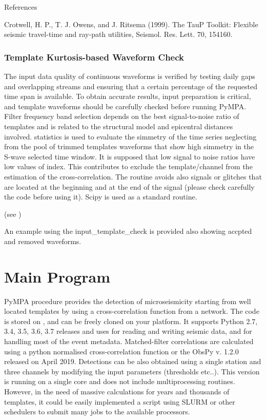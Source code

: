 \documentclass[a4paper,12pt,english]{sphinxmanual}
\let\sphinxpxdimen\pdfpxdimen\else\newdimen\sphinxpxdimen
\begin{document}
References

Crotwell, H. P., T. J. Owens, and J. Ritsema (1999). The TauP Toolkit:
Flexible seismic travel-time and ray-path utilities, Seismol. Res. Lett.
70, 154\textendash{}160.


\subsection{Template Kurtosis-based Waveform Check}
\label{\detokenize{sub/input.template_check:template-kurtosis-based-waveform-check}}\label{\detokenize{sub/input.template_check::doc}}
The input data quality of continuous waveforms is verified by testing daily gaps and overlapping streams and ensuring that a certain percentage of the requested time span is available. To obtain accurate results, input preparation is critical, and template waveforms should be carefully checked before running PyMPA. Filter frequency band selection depends on the best signal-to-noise ratio of templates and is related to the structural model and epicentral distances involved.
 statistics is used to evaluate the simmetry of the time series neglecting from the pool of trimmed templates
waveforms that show high simmetry in the S-wave selected time window. It is supposed that low signal to noise ratios
have low values of  index. This contributes to exclude the template/channel from the estimation of the cross-correlation.
The routine avoids also signals or glitches that are located at the beginning and at the end of the signal (please check carefully the code before using it).
Scipy  is used as a standard routine.

(see )

An example using the input\_template\_check is provided also showing accpted and removed waveforms.
\sphinxhref{https://github.com/avuan/PyMPA37/releases}{\sphinxincludegraphics[width=100\sphinxpxdimen]{{pympa_logo1}.png}}

\chapter{Main Program}
\label{\detokenize{main:main-program}}\label{\detokenize{main::doc}}
PyMPA procedure provides the detection of microseismicity starting from well located templates by using a cross-correlation function from a network.
The code is stored on , and can be freely cloned on your platform. It supports Python 2.7, 3.4, 3.5, 3.6, 3.7
releases and uses  for reading and writing seismic data, and for handling most
of the event metadata. Matched-filter correlations are calculated using a python normalised cross-correlation function or the
ObsPy v. 1.2.0  released on April
2019. Detections can be also obtained using a single station and three channels by modifying the input parameters (thresholds etc..).
This version is running on a single core and does not include multiprocessing routines. However, in the need of massive calculations for years and thousands
of templates, it could be easily implemented a script using SLURM or other schedulers to submit many jobs to the available processors.
\end{document}
